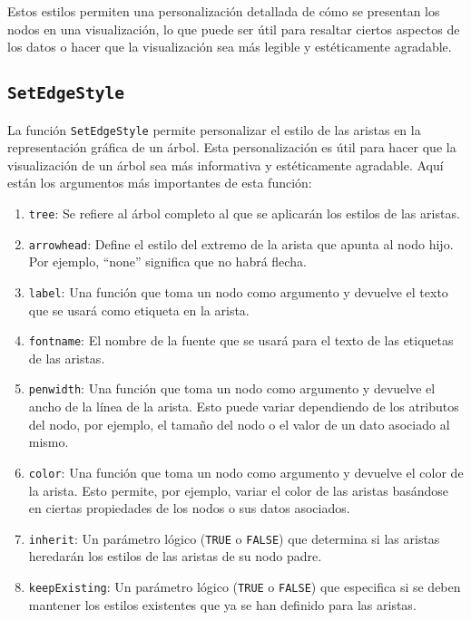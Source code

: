 \documentclass[12pt]{report}\usepackage[]{graphicx}\usepackage[dvipsnames]{xcolor}
\begin{document}
			 	Estos estilos permiten una personalización detallada de cómo se presentan los nodos en una visualización, lo que puede ser útil para resaltar ciertos aspectos de los datos o hacer que la visualización sea más legible y estéticamente agradable.
			 	
		 	\subsection{\texttt{SetEdgeStyle}}
			 	
			 	La función \texttt{SetEdgeStyle} permite personalizar el estilo de las aristas en la representación gráfica de un árbol. Esta personalización es útil para hacer que la visualización de un árbol sea más informativa y estéticamente agradable. Aquí están los argumentos más importantes de esta función:
			 	
			 	\begin{enumerate}
			 		\item \texttt{tree}: Se refiere al árbol completo al que se aplicarán los estilos de las aristas.
			 		
			 		\item \texttt{arrowhead}: Define el estilo del extremo de la arista que apunta al nodo hijo. Por ejemplo, ``none'' significa que no habrá flecha.
			 		
			 		\item \texttt{label}: Una función que toma un nodo como argumento y devuelve el texto que se usará como etiqueta en la arista.
			 		
			 		\item \texttt{fontname}: El nombre de la fuente que se usará para el texto de las etiquetas de las aristas.
			 		
			 		\item \texttt{penwidth}: Una función que toma un nodo como argumento y devuelve el ancho de la línea de la arista. Esto puede variar dependiendo de los atributos del nodo, por ejemplo, el tamaño del nodo o el valor de un dato asociado al mismo.
			 		
			 		\item \texttt{color}: Una función que toma un nodo como argumento y devuelve el color de la arista. Esto permite, por ejemplo, variar el color de las aristas basándose en ciertas propiedades de los nodos o sus datos asociados.
			 		
			 		\item \texttt{inherit}: Un parámetro lógico (\texttt{TRUE} o \texttt{FALSE}) que determina si las aristas heredarán los estilos de las aristas de su nodo padre.
			 		
			 		\item \texttt{keepExisting}: Un parámetro lógico (\texttt{TRUE} o \texttt{FALSE}) que especifica si se deben mantener los estilos existentes que ya se han definido para las aristas.
			 	\end{enumerate}
			 	
\end{document}

